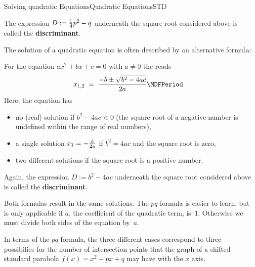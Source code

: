 \begin{MXContent}{Solving quadratic Equations}{Quadratic Equations}{STD}
\begin{MInfo}
The expression $D:=\tfrac{1}{4}p^2-q$ underneath the square root considered above is called the
\textbf{discriminant}.
\end{MInfo}
The solution of a quadratic equation is often described by an alternative formula:
\begin{MInfo}
For the equation $a x^2+b x + c = 0$ with $a\ne 0$ the
 reads
$$
x_{1,2} \;=\; \frac{-b\pm\sqrt{b^2-4 a c}}{2a} \MDFPeriod
$$
Here, the equation has
\begin{itemize}
\item{no (real) solution if $b^2-4 a c<0$ (the square root of a negative number is undefined within the
range of real numbers),}
\item{a single solution $x_1=-\tfrac{b}{2a}$ if $b^2=4 a c$ and the square root is zero,}
\item{two different solutions if the square root is a positive number.}
\end{itemize}
Again, the expression $D:=b^2-4 a c$ underneath the square root considered above is called the 
\textbf{discriminant}.
\end{MInfo}
Both formulas result in the same solutions. The $pq$ formula is easier to learn, but is
only applicable if $a$, the coefficient of the quadratic term, is~$1$. Otherwise we must
divide both sides of the equation by~$a$.
\medskip\par
In terms of the $pq$ formula, the three different cases correspond to three possibilies for the number of intersection points that the graph of a shifted standard parabola
$f(x)=x^2+p x+ q$ may have with the $x$ axis.

\begin{center}
\end{center}


\end{MXContent}

